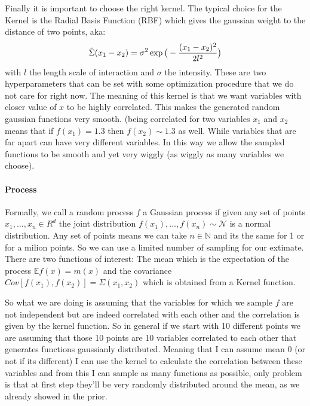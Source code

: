 \documentclass{article}
\begin{document}
Finally it is important to choose the right kernel. The typical choice for the Kernel is the Radial Basis Function (RBF) which gives the gaussian weight to the distance of two points, aka:
\begin{equation}
    \label{kernel}
    \Tilde{\Sigma}(x_1 - x_2) = \sigma^2 \exp \big( - \frac{(x_1 - x_2)^2}{2l^2}\big)
\end{equation}
with $l$ the length scale of interaction and $\sigma$ the intensity. These are two hyperparameters that can be set with some optimization procedure that we do not care for right now. The meaning of this kernel is that we want variables with closer value of $x$ to be highly correlated. This makes the generated random gaussian functions very smooth. (being correlated for two variables $x_1$ and $x_2$ means that if $f(x_1) = 1.3$ then $f(x_2) \sim 1.3$ as well. While variables that are far apart can have very different variables. In this way we allow the sampled functions to be smooth and yet very wiggly (as wiggly as many variables we choose). 

\paragraph{Process}
Formally, we call a random process $f$ a Gaussian process if given any set of points $x_1, \dots, x_n \in R^d$ the joint distribution $f(x_1), \dots, f(x_n) \sim \mathcal{N}$ is a normal distribution. Any set of points means we can take $n \in \mathbb{N}$ and its the same for 1 or for a milion points. So we can use a limited number of sampling for our extimate. There are two functions of interest: The mean which is the expectation of the process $\mathbb{E}f(x) = m(x)$ and the covariance $Cov[f(x_1), f(x_2)] = \Sigma(x_1, x_2)$ which is obtained from a Kernel function.

So what we are doing is assuming that the variables for which we sample $f$ are not independent but are indeed correlated with each other and the correlation is given by the kernel function. So in general if we start with 10 different points we are assuming that those 10 points are 10 variables correlated to each other that generates functions gaussianly distributed. Meaning that I can assume mean 0 (or not if its different) I can use the kernel to calculate the correlation between these variables and from this I can sample as many functions as possible, only problem is that at first step they'll be very randomly distributed around the mean, as we already showed in the prior. 
\end{document}
